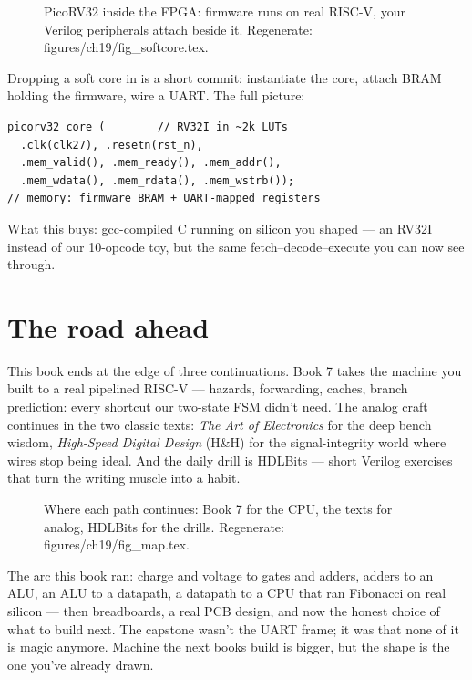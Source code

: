 \begin{figure}[htbp]
\centering

\caption{PicoRV32 inside the FPGA: firmware runs on real RISC-V,
your Verilog peripherals attach beside it. Regenerate: \ttfamily
figures/ch19/fig\_softcore.tex.}
\label{fig:softcore19}
\end{figure}

\begin{example}
Dropping a soft core in is a short commit: instantiate the core,
attach BRAM holding the firmware, wire a UART. The full picture:

\begin{lstlisting}[caption={The soft-core shape (shown; a real
PicoRV32 build is Book 7's material --- its repo is cited).}]
picorv32 core (        // RV32I in ~2k LUTs
  .clk(clk27), .resetn(rst_n),
  .mem_valid(), .mem_ready(), .mem_addr(),
  .mem_wdata(), .mem_rdata(), .mem_wstrb());
// memory: firmware BRAM + UART-mapped registers
\end{lstlisting}

What this buys: gcc-compiled C running on silicon you shaped ---
an RV32I instead of our 10-opcode toy, but the same
fetch--decode--execute you can now see through.
\end{example}

\section{The road ahead}\label{sec:road19}

This book ends at the edge of three continuations. Book 7 takes
the machine you built to a real pipelined RISC-V --- hazards,
forwarding, caches, branch prediction: every shortcut our
two-state FSM didn't need. The analog craft continues in the
two classic texts: \emph{The Art of Electronics} for the deep
bench wisdom, \emph{High-Speed Digital Design} (H\&H) for the
signal-integrity world where wires stop being ideal. And the
daily drill is HDLBits --- short Verilog exercises that turn the
writing muscle into a habit.

\begin{figure}[htbp]
\centering

\caption{Where each path continues: Book 7 for the CPU, the texts
for analog, HDLBits for the drills. Regenerate: \ttfamily
figures/ch19/fig\_map.tex.}
\label{fig:map19}
\end{figure}

The arc this book ran: charge and voltage to gates and adders,
adders to an ALU, an ALU to a datapath, a datapath to a CPU that
ran Fibonacci on real silicon --- then breadboards, a real PCB
design, and now the honest choice of what to build next. The
capstone wasn't the UART frame; it was that none of it is magic
anymore. Machine the next books build is bigger, but the shape is
the one you've already drawn.

